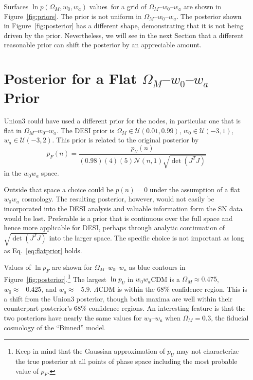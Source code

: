 \documentclass[11pt,a4paper]{article}
\begin{document}
Surfaces   $\ln{p}(\Omega_M, w_0,w_a)$ values\ for a grid of $\Omega_M$--$w_0$--$w_a$ are shown in
Figure~\ref{fig:priors}.   The prior is not uniform in  $\Omega_M$--$w_0$--$w_a$.
The posterior shown in Figure~\ref{fig:posterior} has a different shape,
demonstrating that it is not being driven by the prior.  Nevertheless,
we will see in the next Section that a different reasonable prior can shift the posterior
by an appreciable amount.

\section{Posterior for a Flat  $\Omega_M$--$w_0$--$w_a$  Prior}

Union3 could have used a different prior for the nodes, in particular one
that is flat in $\Omega_M$--$w_0$--$w_a$.
The DESI prior is $\Omega_M \in \mathcal{U}(0.01,0.99)$, $w_0 \in \mathcal{U}(-3,1)$, $w_a \in \mathcal{U}(-3,2)$.
This prior is related to the original posterior by
\begin{equation}
p_F(n) = \frac{p_U(n)}{(0.98)(4)(5) \mathcal{N}(n,1)  \sqrt{\det{\left(J^T J\right)}}}
\label{eq:flatprior}
\end{equation}
in the $w_0w_a$ space.

Outside that space a choice could be $p(n)=0$ under the assumption
of a flat $w_0w_a$ cosmology.  The resulting posterior, however, would not easily be incorporated into the DESI analysis
and valuable information form the SN data would be lost.
Preferable is a prior that is continuous over the full space and hence more applicable for DESI,
perhaps through analytic continuation of $\sqrt{\det{\left(J^T J\right)}}$ into the larger space.
The specific choice is not important as long as Eq.~\ref{eq:flatprior} holds.

Values of $\ln{p}_F$ are shown for  $\Omega_M$--$w_0$--$w_a$ as blue contours in Figure~\ref{fig:posterior}.\footnote{Keep in mind that the Gaussian approximation of $p_U$ may not characterize the true posterior at all points of
phase space including the most probable value of $p_F$.}
The largest $\ln{p_U}$ in $w_0w_a$CDM is a $\Omega_M\approx 0.475$, $w_0 \approx -0.425$, and $w_a \approx -5.9$. $\Lambda$CDM 
is within the 68\% confidence region.  This is a shift from the Union3 posterior, though both maxima are well within their counterpart
posterior's 68\% confidence regions.  An interesting feature is that the two posteriors have nearly the same values for $w_0$--$w_a$ when $\Omega_M=0.3$, the fiducial cosmology of the ``Binned'' model.
\end{document}

